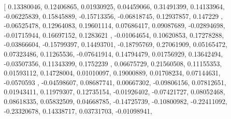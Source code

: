 \documentclass[a4paper
]{article}
\newenvironment{Shaded}{}{}
\newcommand{\FloatTok}[1]{\textcolor[rgb]{0.25,0.63,0.44}{#1}}
\newcommand{\OtherTok}[1]{\textcolor[rgb]{0.00,0.44,0.13}{#1}}
\begin{document}
\begin{Shaded}
\begin{Highlighting}[]
      \OtherTok{[} \FloatTok{0.13380046}\OtherTok{,}  \FloatTok{0.12406865}\OtherTok{,}  \FloatTok{0.01930925}\OtherTok{,}  \FloatTok{0.04459066}\OtherTok{,}  \FloatTok{0.31491399}\OtherTok{,}
        \FloatTok{0.14133964}\OtherTok{,} \FloatTok{{-}0.06225839}\OtherTok{,}  \FloatTok{0.15845889}\OtherTok{,} \FloatTok{{-}0.15713356}\OtherTok{,} \FloatTok{{-}0.06818745}\OtherTok{,}
        \FloatTok{0.12937857}\OtherTok{,}  \FloatTok{0.147229}  \OtherTok{,} \FloatTok{{-}0.06525478}\OtherTok{,}  \FloatTok{0.12964083}\OtherTok{,}  \FloatTok{0.19601114}\OtherTok{,}
        \FloatTok{0.07686417}\OtherTok{,}  \FloatTok{0.09087689}\OtherTok{,} \FloatTok{{-}0.02894698}\OtherTok{,} \FloatTok{{-}0.01715944}\OtherTok{,}  \FloatTok{0.16697152}\OtherTok{,}
        \FloatTok{0.1283621} \OtherTok{,} \FloatTok{{-}0.01064654}\OtherTok{,}  \FloatTok{0.10620853}\OtherTok{,}  \FloatTok{0.17278288}\OtherTok{,} \FloatTok{{-}0.03866604}\OtherTok{,}
       \FloatTok{{-}0.15799397}\OtherTok{,}  \FloatTok{0.14493701}\OtherTok{,} \FloatTok{{-}0.18795769}\OtherTok{,}  \FloatTok{0.27061909}\OtherTok{,}  \FloatTok{0.05165472}\OtherTok{,}
        \FloatTok{0.07323486}\OtherTok{,}  \FloatTok{0.11265536}\OtherTok{,} \FloatTok{{-}0.07641914}\OtherTok{,}  \FloatTok{0.14794479}\OtherTok{,}  \FloatTok{0.01756929}\OtherTok{,}
        \FloatTok{0.13642494}\OtherTok{,} \FloatTok{{-}0.03507356}\OtherTok{,}  \FloatTok{0.11343399}\OtherTok{,}  \FloatTok{0.1752239} \OtherTok{,}  \FloatTok{0.06675729}\OtherTok{,}
        \FloatTok{0.21560508}\OtherTok{,}  \FloatTok{0.11155353}\OtherTok{,}  \FloatTok{0.01593112}\OtherTok{,}  \FloatTok{0.14728004}\OtherTok{,}  \FloatTok{0.01010097}\OtherTok{,}
        \FloatTok{0.19000889}\OtherTok{,}  \FloatTok{0.01708234}\OtherTok{,}  \FloatTok{0.07144631}\OtherTok{,} \FloatTok{{-}0.0570593} \OtherTok{,} \FloatTok{{-}0.04598607}\OtherTok{,}
        \FloatTok{0.08687741}\OtherTok{,}  \FloatTok{0.00667302}\OtherTok{,} \FloatTok{{-}0.09806156}\OtherTok{,}  \FloatTok{0.07812651}\OtherTok{,}  \FloatTok{0.01943411}\OtherTok{,}
        \FloatTok{0.11979307}\OtherTok{,}  \FloatTok{0.12735154}\OtherTok{,} \FloatTok{{-}0.01926402}\OtherTok{,} \FloatTok{{-}0.07421727}\OtherTok{,}  \FloatTok{0.08052468}\OtherTok{,}
        \FloatTok{0.08618335}\OtherTok{,}  \FloatTok{0.05832509}\OtherTok{,}  \FloatTok{0.04668785}\OtherTok{,} \FloatTok{{-}0.14725739}\OtherTok{,} \FloatTok{{-}0.10800982}\OtherTok{,}
       \FloatTok{{-}0.22411092}\OtherTok{,} \FloatTok{{-}0.23320678}\OtherTok{,}  \FloatTok{0.14338717}\OtherTok{,}  \FloatTok{0.03731703}\OtherTok{,} \FloatTok{{-}0.01098941}\OtherTok{,}

\end{Highlighting}
\end{Shaded}
\end{document}
